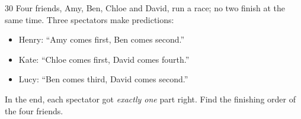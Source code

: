 \documentclass[11pt]{article}
\newenvironment{probbox}[2]{\begin{probboxT}{#1}{#2}}{\end{probboxT}}
\begin{document}
\begin{probbox}{30}{\relax}
Four friends, Amy, Ben, Chloe and David, run a race; no two finish at the same time. Three spectators make predictions:
\begin{itemize}[leftmargin=1.6em,itemsep=0pt,topsep=2pt]
\item Henry: ``Amy comes first, Ben comes second.''
\item Kate: ``Chloe comes first, David comes fourth.''
\item Lucy: ``Ben comes third, David comes second.''
\end{itemize}
In the end, each spectator got \emph{exactly one} part right. Find the finishing order of the four friends.
\end{probbox}
\end{document}
